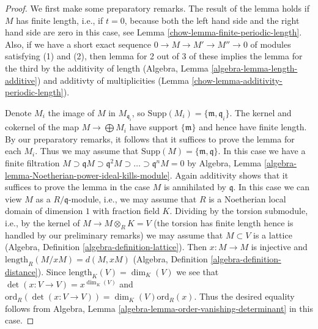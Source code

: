 \begin{proof}

We first make some preparatory remarks.
The result of the lemma holds if $M$ has finite length, i.e., if $t = 0$,
because both the left hand side and the right hand side are zero
in this case, see Lemma \ref{chow-lemma-finite-periodic-length}.
Also, if we have a short exact sequence $0 \to M \to M' \to M'' \to 0$
of modules satisfying (1) and (2), then lemma for 2 out of 3
of these implies the lemma for the third by the
additivity of length (Algebra, Lemma \ref{algebra-lemma-length-additive}) and
additivty of multiplicities (Lemma \ref{chow-lemma-additivity-periodic-length}).

\medskip\noindent
Denote $M_i$ the image of $M$ in $M_{\mathfrak q_i}$, so
$\text{Supp}(M_i) = \{\mathfrak m, \mathfrak q_i\}$.
The kernel and cokernel of the map $M \to \bigoplus M_i$
have support $\{\mathfrak m\}$ and hence have finite length.
By our preparatory remarks, it follows that it suffices to
prove the lemma for each $M_i$. Thus we may assume that
$\text{Supp}(M) = \{\mathfrak m, \mathfrak q\}$.
In this case we have a finite filtration
$M \supset \mathfrak qM \supset \mathfrak q^2M \supset \ldots \supset
\mathfrak q^nM = 0$ by Algebra, Lemma
\ref{algebra-lemma-Noetherian-power-ideal-kills-module}.
Again additivity shows that it suffices to prove the lemma
in the case $M$ is annihilated by $\mathfrak q$.
In this case we can view $M$ as a $R/\mathfrak q$-module,
i.e., we may assume that $R$ is a Noetherian local domain
of dimension $1$ with fraction field $K$.
Dividing by the torsion submodule, i.e., by the
kernel of $M \to M \otimes_R K = V$ (the torsion has
finite length hence is handled by our preliminary remarks)
we may assume that $M \subset V$ is a lattice
(Algebra, Definition \ref{algebra-definition-lattice}).
Then $x : M \to M$ is injective and
$\text{length}_R(M/xM) = d(M, xM)$
(Algebra, Definition \ref{algebra-definition-distance}). Since
$\text{length}_K(V) = \dim_K(V)$
we see that $\det(x : V \to V) = x^{\dim_K(V)}$ and
$\text{ord}_R(\det(x : V \to V)) = \dim_K(V) \text{ord}_R(x)$.
Thus the desired equality follows from
Algebra, Lemma \ref{algebra-lemma-order-vanishing-determinant}
in this case.
\end{proof}

